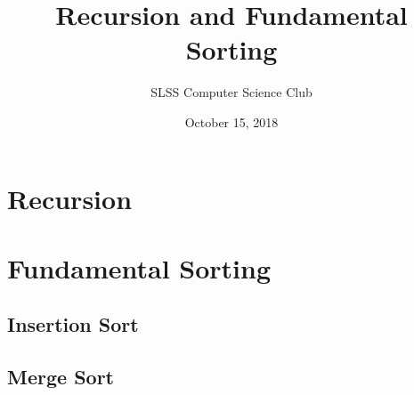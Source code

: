 \documentclass[prereq]{cslesson}
\title{Recursion and Fundamental Sorting}
\author{SLSS Computer Science Club}
\date{October 15, 2018}
\begin{document}
\maketitle

\section{Recursion}
\section{Fundamental Sorting}
\subsection{Insertion Sort}
\subsection{Merge Sort}
\end{document}
